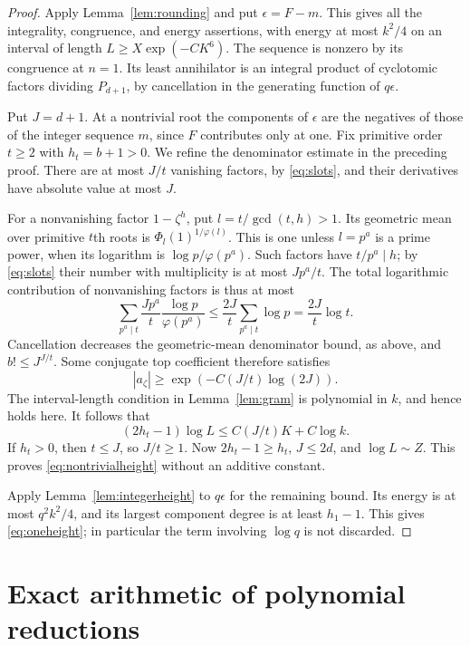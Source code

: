 \documentclass[11pt]{amsart}
\numberwithin{equation}{section}
\theoremstyle{remark}
\begin{document}
\begin{proof}
Apply Lemma~\ref{lem:rounding} and put \(\epsilon=F-m\).
This gives all the integrality, congruence, and energy assertions,
with energy at most \(k^2/4\) on an interval of length
\(L\ge X\exp(-CK^6)\). The sequence is nonzero by its congruence at
\(n=1\). Its least annihilator is an integral product of cyclotomic
factors dividing \(P_{d+1}\), by cancellation in the generating
function of \(q\epsilon\).

Put \(J=d+1\). At a nontrivial root the components of \(\epsilon\)
are the negatives of those of the integer sequence \(m\), since \(F\)
contributes only at one. Fix primitive order \(t\ge2\) with
\(h_t=b+1>0\). We refine the denominator estimate in the preceding proof.
There are at most \(J/t\) vanishing factors, by \eqref{eq:slots}, and
their derivatives have absolute value at most \(J\).

For a nonvanishing factor \(1-\zeta^h\), put \(l=t/\gcd(t,h)>1\).
Its geometric mean over primitive \(t\)th roots is
\(\Phi_l(1)^{1/\varphi(l)}\).
This is one unless \(l=p^a\) is a prime power, when its logarithm is
\(\log p/\varphi(p^a)\). Such factors have \(t/p^a\mid h\);
by \eqref{eq:slots} their number with multiplicity is at most \(Jp^a/t\).
The total logarithmic contribution of nonvanishing factors is thus
at most
\[
 \sum_{p^a\mid t}\frac{Jp^a}t
       \frac{\log p}{\varphi(p^a)}
 \le\frac{2J}t\sum_{p^a\mid t}\log p
 =\frac{2J}t\log t.
\]
Cancellation decreases the geometric-mean denominator bound, as above,
and \(b!\le J^{J/t}\). Some conjugate top coefficient therefore satisfies
\[
 |a_\zeta|\ge\exp\!\left(-C(J/t)\log(2J)\right).
\]
The interval-length condition in Lemma~\ref{lem:gram} is polynomial in
\(k\), and hence holds here. It follows that
\[
 (2h_t-1)\log L\le C(J/t)K+C\log k.
\]
If \(h_t>0\), then \(t\le J\), so \(J/t\ge1\).
Now \(2h_t-1\ge h_t\), \(J\le2d\), and \(\log L\sim Z\).
This proves \eqref{eq:nontrivialheight} without an additive constant.

Apply Lemma~\ref{lem:integerheight} to \(q\epsilon\) for the remaining
bound. Its energy is at most \(q^2k^2/4\), and its largest component
degree is at least \(h_1-1\). This gives \eqref{eq:oneheight};
in particular the term involving \(\log q\) is not discarded.
\end{proof}

\section{Exact arithmetic of polynomial reductions}\label{sec:arithmetic}
\end{document}
